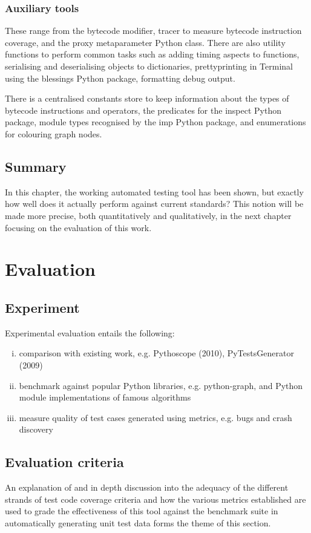 \documentclass{icldt}
\numberwithin{equation}{section}       %
\newcommand{\blankpage}{
\newpage
\thispagestyle{empty}
\mbox{}
\newpage
}
\begin{document}
{{\subsection{Auxiliary tools}
These range from the bytecode modifier, tracer to measure bytecode instruction coverage,  and the proxy metaparameter Python class. There are also utility functions to perform common tasks such as adding timing aspects to functions, serialising and deserialising objects to dictionaries, prettyprinting in Terminal using the \textsf{blessings} Python package, formatting debug output.

There is a centralised constants store to keep information about the types of bytecode instructions and operators, the predicates for the \textsf{inspect} Python package, module types recognised by the \textsf{imp} Python package, and enumerations for colouring graph nodes.

\section{Summary}
In this chapter, the working automated testing tool has been shown, but exactly how well does it actually perform against current standards? This notion will be made more precise, both quantitatively and qualitatively, in the next chapter focusing on the evaluation of this work.
\blankpage
\chapter{Evaluation}
\label{ch:eval}
\section{Experiment}
Experimental evaluation entails the following:
\begin{enumerate}[i.]
	\item comparison with existing work, e.g. Pythoscope (2010), PyTestsGenerator (2009)
	\item benchmark against popular Python libraries, e.g. python-graph, and Python module implementations of famous algorithms
	\item measure quality of test cases generated using metrics, e.g. bugs and crash discovery
\end{enumerate}

\section{Evaluation criteria}
An explanation of and in depth discussion into the adequacy of the different strands of test code coverage criteria and how the various metrics established are used to grade the effectiveness of this tool against the benchmark suite in automatically generating unit test data forms the theme of this section.

}}
\end{document}
